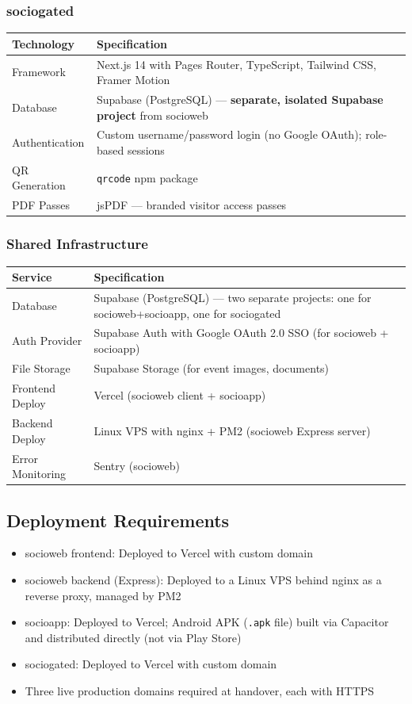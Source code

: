\documentclass[12pt,a4paper]{article}
\begin{document}
\subsubsection{sociogated}

\begin{tabularx}{\textwidth}{L{4cm} X}
\toprule
{}
\textbf{Technology} & \textbf{Specification} \\
\midrule
Framework & Next.js 14 with Pages Router, TypeScript, Tailwind CSS, Framer Motion \\
Database & Supabase (PostgreSQL) — \textbf{separate, isolated Supabase project} from socioweb \\
Authentication & Custom username/password login (no Google OAuth); role-based sessions \\
QR Generation & \texttt{qrcode} npm package \\
PDF Passes & jsPDF — branded visitor access passes \\
\bottomrule
\end{tabularx}

\subsubsection{Shared Infrastructure}

\begin{tabularx}{\textwidth}{L{4cm} X}
\toprule
{}
\textbf{Service} & \textbf{Specification} \\
\midrule
Database & Supabase (PostgreSQL) — two separate projects: one for socioweb+socioapp, one for sociogated \\
Auth Provider & Supabase Auth with Google OAuth 2.0 SSO (for socioweb + socioapp) \\
File Storage & Supabase Storage (for event images, documents) \\
Frontend Deploy & Vercel (socioweb client + socioapp) \\
Backend Deploy & Linux VPS with nginx + PM2 (socioweb Express server) \\
Error Monitoring & Sentry (socioweb) \\
\bottomrule
\end{tabularx}

\subsection{Deployment Requirements}

\begin{itemize}[leftmargin=*]
    \item socioweb frontend: Deployed to Vercel with custom domain
    \item socioweb backend (Express): Deployed to a Linux VPS behind nginx as a reverse proxy, managed by PM2
    \item socioapp: Deployed to Vercel; Android APK (\texttt{.apk} file) built via Capacitor and distributed directly (not via Play Store)
    \item sociogated: Deployed to Vercel with custom domain
    \item Three live production domains required at handover, each with HTTPS
\end{itemize}
\end{document}
